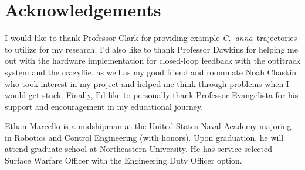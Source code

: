 \documentclass[onecolumn,10pt]{IEEEtran}
\newcommand{\myroot}{../}
\newcommand{\Canna}{\emph{C.~anna}}
\begin{document}
\clearpage



\section*{Acknowledgements}
I would like to thank Professor Clark for providing example \Canna\ trajectories to utilize for my research. I'd also like to thank Professor Dawkins for helping me out with the hardware implementation for closed-loop feedback with the optitrack system and the crazyflie, as well as my good friend and roommate Noah Chaskin who took interest in my project and helped me think through problems when I would get stuck. Finally, I'd like to personally thank Professor Evangelista for his support and encouragement in my educational journey.







%

  


\begin{IEEEbiography}{Ethan Marcello} is a midshipman at the United States Naval Academy majoring in Robotics and Control Engineering (with honors). Upon graduation, he will attend graduate school at Northeastern University.  He has service selected Surface Warfare Officer with the Engineering Duty Officer option. 
\end{IEEEbiography}

%
\end{document}
